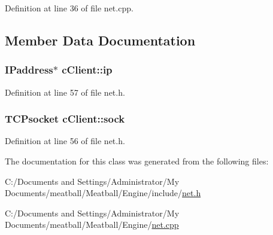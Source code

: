 Definition at line 36 of file net.\-cpp.



\subsection{Member Data Documentation}
\hypertarget{classc_client_ad1240b8a24e3339b48f07bd4de556336}{
\subsubsection[{ip}]{\setlength{\rightskip}{0pt plus 5cm}I\-Paddress$\ast$ c\-Client\-::ip}}\label{classc_client_ad1240b8a24e3339b48f07bd4de556336}


Definition at line 57 of file net.\-h.

\hypertarget{classc_client_ada06233a81c09623a3ebb76897b1d3a9}{
\subsubsection[{sock}]{\setlength{\rightskip}{0pt plus 5cm}T\-C\-Psocket c\-Client\-::sock}}\label{classc_client_ada06233a81c09623a3ebb76897b1d3a9}


Definition at line 56 of file net.\-h.



The documentation for this class was generated from the following files\-:\begin{DoxyCompactItemize}
\item 
C\-:/\-Documents and Settings/\-Administrator/\-My Documents/meatball/\-Meatball/\-Engine/include/\hyperlink{net_8h}{net.\-h}\item 
C\-:/\-Documents and Settings/\-Administrator/\-My Documents/meatball/\-Meatball/\-Engine/\hyperlink{net_8cpp}{net.\-cpp}\end{DoxyCompactItemize}
